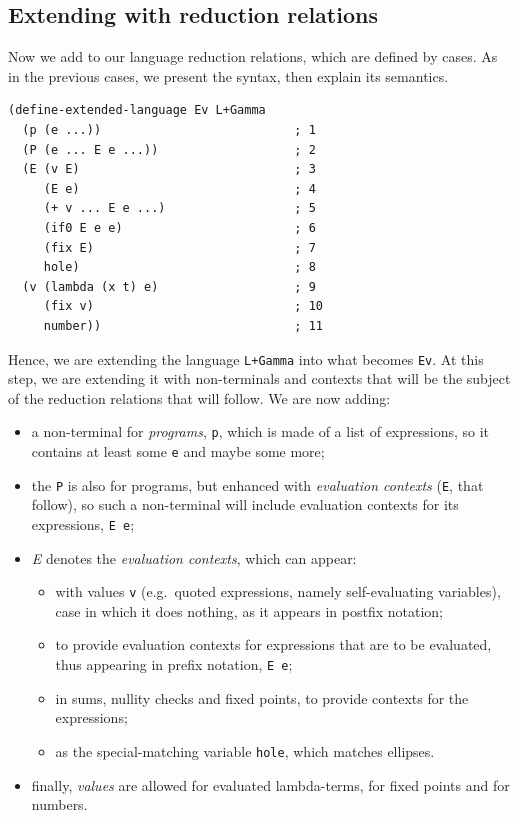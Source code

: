 \subsection{Extending with reduction relations}

Now we add to our language reduction relations, which are defined by cases.
As in the previous cases, we present the syntax, then explain its semantics.

{
  \small
\begin{verbatim}
(define-extended-language Ev L+Gamma
  (p (e ...))                           ; 1
  (P (e ... E e ...))                   ; 2
  (E (v E)                              ; 3
     (E e)                              ; 4
     (+ v ... E e ...)                  ; 5
     (if0 E e e)                        ; 6
     (fix E)                            ; 7
     hole)                              ; 8
  (v (lambda (x t) e)                   ; 9
     (fix v)                            ; 10
     number))                           ; 11
\end{verbatim}
}

Hence, we are extending the language \texttt{L+Gamma} into what becomes \texttt{Ev}.
At this step, we are extending it with non-terminals and contexts that will be the
subject of the reduction relations that will follow. We are now adding:
\begin{itemize}
\item a non-terminal for \emph{programs}, \texttt{p}, which is made of
  a list of expressions, so it contains at least some \texttt{e} and maybe some more;
\item the \texttt{P} is also for programs, but enhanced with \emph{evaluation contexts}
  (\texttt{E}, that follow), so such a non-terminal will include evaluation contexts
  for its expressions, \texttt{E e};
\item \emph{E} denotes the \emph{evaluation contexts}, which can appear:
  \begin{itemize}
  \item with values \texttt{v} (e.g.\ quoted expressions, namely self-evaluating
    variables), case in which it does nothing, as it appears in postfix notation;
  \item to provide evaluation contexts for expressions that are to be evaluated,
    thus appearing in prefix notation, \texttt{E e};
  \item in sums, nullity checks and fixed points, to provide contexts for the
    expressions;
  \item as the special-matching variable \texttt{hole}, which matches ellipses.
  \end{itemize}
\item finally, \emph{values} are allowed for evaluated lambda-terms, for fixed points
  and for numbers.
\end{itemize}

